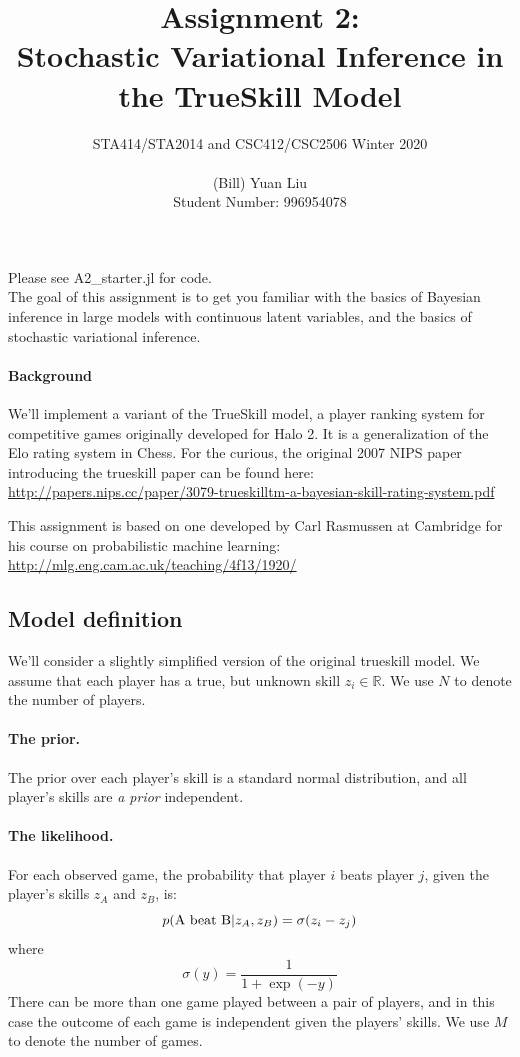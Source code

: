 \documentclass{article}
\begin{document}
\title{Assignment 2:\\Stochastic Variational Inference in the TrueSkill Model}
\author{STA414/STA2014 and CSC412/CSC2506 Winter 2020\\
  \\
  (Bill) Yuan Liu\\
  Student Number: 996954078
}
\maketitle

Please see A2\_starter.jl for code.\\

The goal of this assignment is to get you familiar with the basics of
Bayesian inference in large models with continuous latent variables, and the basics of stochastic variational inference.

\paragraph{Background}
We'll implement a variant of the TrueSkill model, a player ranking system for competitive games originally developed for Halo 2.
It is a generalization of the Elo rating system in Chess.
For the curious, the original 2007 NIPS paper introducing the trueskill paper can be found here:
\url{http://papers.nips.cc/paper/3079-trueskilltm-a-bayesian-skill-rating-system.pdf}

This assignment is based on one developed by Carl Rasmussen at Cambridge for his course on probabilistic machine learning:
\url{http://mlg.eng.cam.ac.uk/teaching/4f13/1920/}


\subsection{Model definition}
We'll consider a slightly simplified version of the original trueskill model.
We assume that each player has a true, but unknown skill $z_i \in \mathbb{R}$.
We use $N$ to denote the number of players.

\paragraph{The prior.}
The prior over each player's skill is a standard normal distribution, and all player's skills are \emph{a prior} independent.  

\paragraph{The likelihood.}
For each observed game, the probability that player $i$ beats player $j$, given the player's skills $z_A$ and $z_B$, is:
$$p(\textnormal{A beat B} | z_A, z_B) = \sigma(z_i - z_j)$$
where
$$\sigma(y) = \frac{1}{1 + \exp(-y)}$$
There can be more than one game played between a pair of players, and in this case the outcome of each game is independent given the players' skills.
We use $M$ to denote the number of games.
\end{document}
